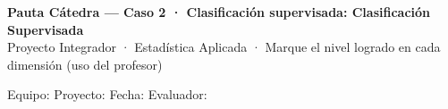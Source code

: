 \documentclass[11pt,letterpaper]{article}
\begin{document}
\begin{center}
{\large \textbf{Pauta Cátedra --- Caso 2 · Clasificación supervisada: Clasificación Supervisada}}\\[0.1cm]
{\footnotesize Proyecto Integrador · Estadística Aplicada · Marque el nivel logrado en cada dimensión (uso del profesor)}
\end{center}
\vspace{0.05cm}
{\small Equipo: \underline{\hspace{5cm}}\quad Proyecto: \underline{\hspace{5.5cm}}\quad Fecha: \underline{\hspace{2.6cm}}\quad Evaluador: \underline{\hspace{3.5cm}}}
\vspace{0.15cm}

\footnotesize\renewcommand{\arraystretch}{1.15}
\end{document}
